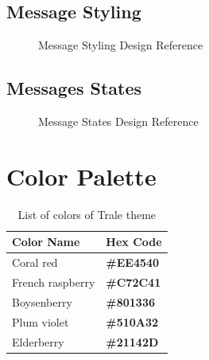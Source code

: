 \subsection{Message Styling}\label{subsec:message-styling}

\begin{figure}[ht]
    \caption{Message Styling Design Reference}
    \centering\def\svgwidth{15cm}\label{fig:figure2}
\end{figure}


\subsection{Messages States}\label{subsec:messages-states}
\begin{figure}[ht]
    \caption{Message States Design Reference}
    \centering\def\svgwidth{15cm}\label{fig:figure3}
\end{figure}

\section{Color Palette}\label{sec:color-palette}

\begin{table}[hb]
    \centering
    \begin{tabular}{|l|l|}
        \hline
        \textbf{Color Name} & \textbf{Hex Code}\\ \hline
        Coral red & \color[HTML]{EE4540}\textbf{\#EE4540} \\ \hline
        French raspberry & \color[HTML]{C72C41}\textbf{\#C72C41} \\ \hline
        Boysenberry & \color[HTML]{801336}\textbf{\#801336} \\ \hline
        Plum violet & \color[HTML]{510A32}\textbf{\#510A32} \\ \hline
        Elderberry & \color[HTML]{21142D}\textbf{\#21142D} \\ \hline
    \end{tabular}
    \caption{List of colors of Trale theme}
    \label{tab:colorTable}
\end{table}

